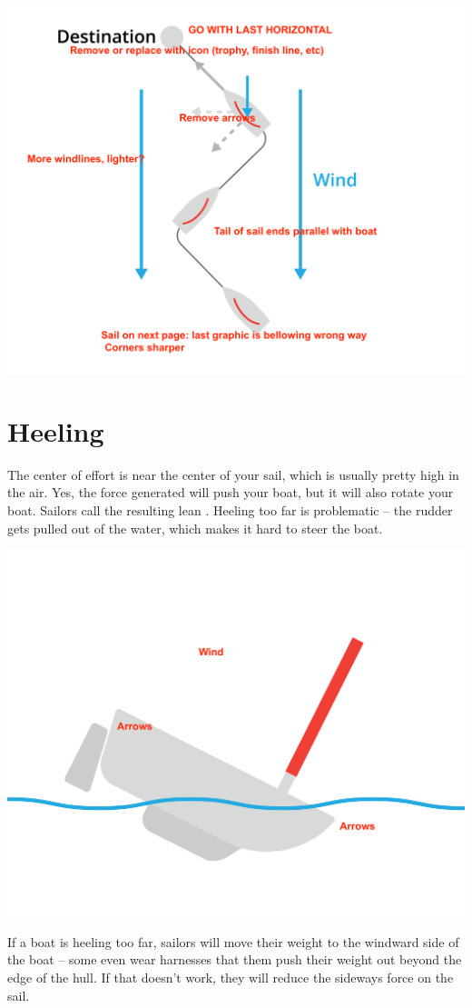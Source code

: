 \includegraphics[width=.75\textwidth]{tacking.png}


\section{Heeling}

The center of effort is near the center of your sail,  which is usually pretty high in the air.   Yes, the force generated will push your boat,  but it will also rotate your boat.  Sailors call
the resulting lean .    Heeling too far is problematic -- the rudder gets pulled out of the water, which makes it hard to steer the boat.

\includegraphics[width=.75\textwidth]{heeling.png}


If a boat is heeling too far,  sailors will move their weight to the windward side of the boat -- some even wear harnesses that them push their weight out beyond the edge of the hull.  
If that doesn't work, they will reduce the sideways force on the sail.

